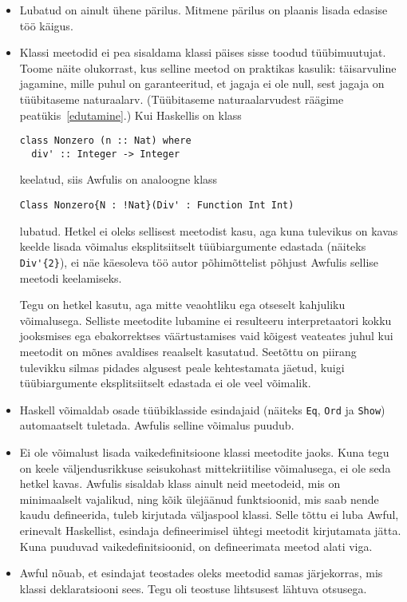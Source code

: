 \documentclass[12pt]{article}
\begin{document}
      \begin{itemize}
        \item
          Lubatud on ainult ühene pärilus. Mitmene pärilus on plaanis lisada edasise töö käigus.
        \item
          Klassi meetodid ei pea sisaldama klassi päises sisse toodud tüübimuutujat. Toome näite olukorrast, kus selline meetod on praktikas kasulik: täisarvuline jagamine, mille puhul on garanteeritud, et jagaja ei ole null, sest jagaja on tüübitaseme naturaalarv. (Tüübitaseme naturaalarvudest räägime peatükis~\ref{edutamine}.) Kui Haskellis on klass

          \begin{verbatim}class Nonzero (n :: Nat) where
  div' :: Integer -> Integer\end{verbatim}

          keelatud, siis Awfulis on analoogne klass

          \begin{verbatim}Class Nonzero{N : !Nat}(Div' : Function Int Int)\end{verbatim}

          lubatud. Hetkel ei oleks sellisest meetodist kasu, aga kuna tulevikus on kavas keelde lisada võimalus eksplitsiitselt tüübiargumente edastada (näiteks \verb!Div'{2}!), ei näe käesoleva töö autor põhimõttelist põhjust Awfulis sellise meetodi keelamiseks.

          Tegu on hetkel kasutu, aga mitte veaohtliku ega otseselt kahjuliku võimalusega. Selliste meetodite lubamine ei resulteeru interpretaatori kokku jooksmises ega ebakorrektses väärtustamises vaid kõigest veateates juhul kui meetodit on mõnes avaldises reaalselt kasutatud. Seetõttu on piirang tulevikku silmas pidades algusest peale kehtestamata jäetud, kuigi tüübiargumente eksplitsiitselt edastada ei ole veel võimalik.
        \item
          Haskell võimaldab osade tüübiklasside esindajaid (näiteks \verb!Eq!, \verb!Ord! ja \verb!Show!) automaatselt tuletada. Awfulis selline võimalus puudub.
        \item
          Ei ole võimalust lisada vaikedefinitsioone klassi meetodite jaoks. Kuna tegu on keele väljendusrikkuse seisukohast mittekriitilise võimalusega, ei ole seda hetkel kavas. Awfulis sisaldab klass ainult neid meetodeid, mis on minimaalselt vajalikud, ning kõik ülejäänud funktsioonid, mis saab nende kaudu defineerida, tuleb kirjutada väljaspool klassi. Selle tõttu ei luba Awful, erinevalt Haskellist, esindaja defineerimisel ühtegi meetodit kirjutamata jätta. Kuna puuduvad vaikedefinitsioonid, on defineerimata meetod alati viga.
        \item
          Awful nõuab, et esindajat teostades oleks meetodid samas järjekorras, mis klassi deklaratsiooni sees. Tegu oli teostuse lihtsusest lähtuva otsusega.
      \end{itemize}
\end{document}
